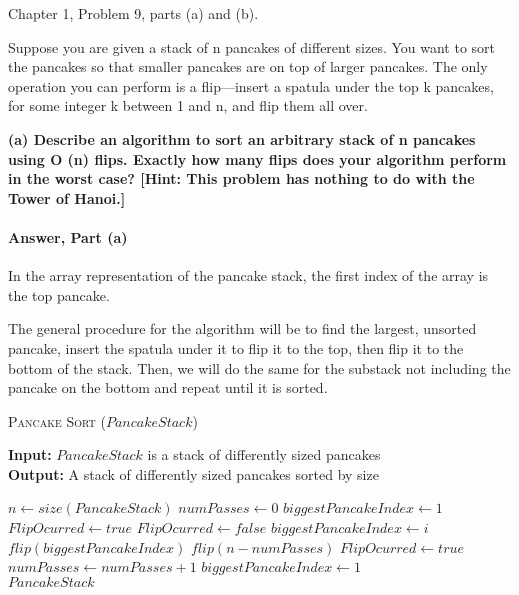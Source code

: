 \documentclass{article}
\begin{document}

Chapter 1, Problem 9, parts (a) and (b).

Suppose you are given a stack of n pancakes of different sizes. You want to
sort the pancakes so that smaller pancakes are on top of larger pancakes.
The only operation you can perform is a flip—insert a spatula under the
top k pancakes, for some integer k between 1 and n, and flip them all over.

{\bf (a) Describe an algorithm to sort an arbitrary stack of n pancakes using
O (n) flips. Exactly how many flips does your algorithm perform in the
worst case? [Hint: This problem has nothing to do with the Tower of
Hanoi.]}

\paragraph{Answer, Part (a)}

In the array representation of the pancake stack, the first index of the array
is the top pancake.

The general procedure for the algorithm will be to find the largest, unsorted pancake,
insert the spatula under it to flip it to the top, then flip it to the bottom of the stack.
Then, we will do the same for the substack not including the pancake on the bottom and repeat until it is sorted.

\begin{algorithm} \caption{\textsc{Pancake Sort} ($PancakeStack$)}\label{alg:seb}
    {\bf Input:} $PancakeStack$ is a stack of differently sized pancakes\\
    {\bf Output:} A stack of differently sized pancakes sorted by size
    \begin{algorithmic}[1]
        \State$n \gets size(PancakeStack)$
        \State$numPasses \gets 0$
        \State$biggestPancakeIndex \gets 1$
        \State$FlipOcurred \gets true$
        \State$FlipOcurred \gets false$
        \State$biggestPancakeIndex \gets i$
        \EndIf{}
        \EndFor{}
        \State$flip(biggestPancakeIndex)$
        \State$flip(n - numPasses)$
        \State$FlipOcurred \gets true$
        \EndIf{}
        \State$ numPasses \gets numPasses + 1$
        \State$biggestPancakeIndex \gets 1$
        \EndWhile{}\\
        \Return$PancakeStack$
    \end{algorithmic}
\end{algorithm}
\end{document}
